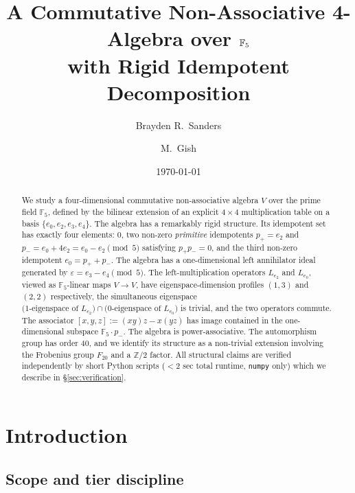 \documentclass[11pt,reqno]{amsart}
\title[A 4-algebra over $\F_5$ with rigid idempotent decomposition]
{A Commutative Non-Associative 4-Algebra over $\F_5$\\
 with Rigid Idempotent Decomposition}
\author{Brayden R.\ Sanders}
\author{M.\ Gish}
\date{\today}
\theoremstyle{plain}
\theoremstyle{definition}
\theoremstyle{remark}
\newcommand{\Z}{\mathbb{Z}}
\newcommand{\F}{\mathbb{F}}
\begin{document}
\begin{abstract}
We study a four-dimensional commutative non-associative algebra $V$ over the prime field $\F_5$, defined by the bilinear extension of an explicit $4 \times 4$ multiplication table on a basis $\{e_0, e_2, e_3, e_4\}$. The algebra has a remarkably rigid structure. Its idempotent set has exactly four elements: $0$, two non-zero \emph{primitive} idempotents $p_+ = e_2$ and $p_- = e_0 + 4 e_2 = e_0 - e_2 \pmod 5$ satisfying $p_+ p_- = 0$, and the third non-zero idempotent $e_0 = p_+ + p_-$. The algebra has a one-dimensional left annihilator ideal generated by $\varepsilon = e_3 - e_4 \pmod 5$. The left-multiplication operators $L_{e_2}$ and $L_{e_0}$, viewed as $\F_5$-linear maps $V \to V$, have eigenspace-dimension profiles $(1, 3)$ and $(2, 2)$ respectively, the simultaneous eigenspace $\bigl(\text{1-eigenspace of } L_{e_2}\bigr) \cap \bigl(\text{0-eigenspace of } L_{e_0}\bigr)$ is trivial, and the two operators commute. The associator $[x, y, z] := (xy)z - x(yz)$ has image contained in the one-dimensional subspace $\F_5 \cdot p_-$. The algebra is power-associative. The automorphism group has order $40$, and we identify its structure as a non-trivial extension involving the Frobenius group $F_{20}$ and a $\Z/2$ factor. All structural claims are verified independently by short Python scripts ($< 2$ sec total runtime, \texttt{numpy} only) which we describe in §\ref{sec:verification}.
\end{abstract}

\maketitle

\tableofcontents

\section{Introduction}
\label{sec:intro}

\subsection{Scope and tier discipline}
\end{document}
